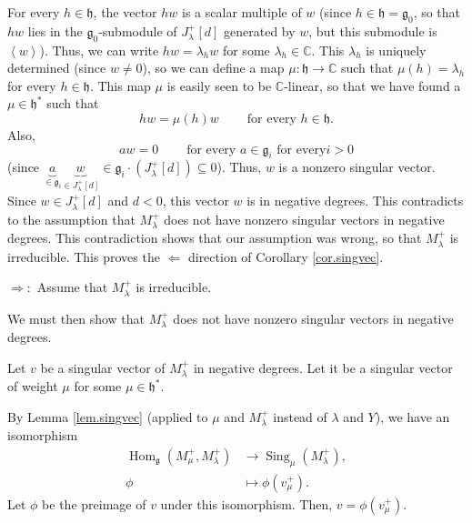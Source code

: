 \documentclass[etingof-lie.tex]{subfiles}
\begin{document}
For every $h\in\mathfrak{h}$, the vector $hw$ is a scalar multiple of $w$
(since $h\in\mathfrak{h}=\mathfrak{g}_{0}$, so that $hw$ lies in the
$\mathfrak{g}_{0}$-submodule of $J_{\lambda}^{+}\left[  d\right]  $ generated
by $w$, but this submodule is $\left\langle w\right\rangle $). Thus, we can
write $hw=\lambda_{h}w$ for some $\lambda_{h}\in\mathbb{C}$. This $\lambda
_{h}$ is uniquely determined (since $w\neq0$), so we can define a map
$\mu:\mathfrak{h}\rightarrow\mathbb{C}$ such that $\mu\left(  h\right)
=\lambda_{h}$ for every $h\in\mathfrak{h}$. This map $\mu$ is easily seen to
be $\mathbb{C}$-linear, so that we have found a $\mu\in\mathfrak{h}^{\ast}$
such that%
\[
hw=\mu\left(  h\right)  w\ \ \ \ \ \ \ \ \ \ \text{for every }h\in
\mathfrak{h}.
\]
Also,%
\[
aw=0\ \ \ \ \ \ \ \ \ \ \text{for every }a\in\mathfrak{g}_{i}\text{ for every
}i>0
\]
(since $\underbrace{a}_{\in\mathfrak{g}_{i}}\underbrace{w}_{\in J_{\lambda
}^{+}\left[  d\right]  }\in\mathfrak{g}_{i}\cdot\left(  J_{\lambda}^{+}\left[
d\right]  \right)  \subseteq0$). Thus, $w$ is a nonzero singular vector. Since
$w\in J_{\lambda}^{+}\left[  d\right]  $ and $d<0$, this vector $w$ is in
negative degrees. This contradicts to the assumption that $M_{\lambda}^{+}$
does not have nonzero singular vectors in negative degrees. This contradiction
shows that our assumption was wrong, so that $M_{\lambda}^{+}$ is irreducible.
This proves the $\Longleftarrow$ direction of Corollary \ref{cor.singvec}.

$\Longrightarrow:$ Assume that $M_{\lambda}^{+}$ is irreducible.

We must then show that $M_{\lambda}^{+}$ does not have nonzero singular
vectors in negative degrees.

Let $v$ be a singular vector of $M_{\lambda}^{+}$ in negative degrees. Let it
be a singular vector of weight $\mu$ for some $\mu\in\mathfrak{h}^{\ast}$.

By Lemma \ref{lem.singvec} (applied to $\mu$ and $M_{\lambda}^{+}$ instead of
$\lambda$ and $Y$), we have an isomorphism%
\begin{align*}
\operatorname*{Hom}\nolimits_{\mathfrak{g}}\left(  M_{\mu}^{+},M_{\lambda}%
^{+}\right)   &  \rightarrow\operatorname*{Sing}\nolimits_{\mu}\left(
M_{\lambda}^{+}\right)  ,\\
\phi &  \mapsto\phi\left(  v_{\mu}^{+}\right)  .
\end{align*}
Let $\phi$ be the preimage of $v$ under this isomorphism. Then, $v=\phi\left(
v_{\mu}^{+}\right)  $.
\end{document}
